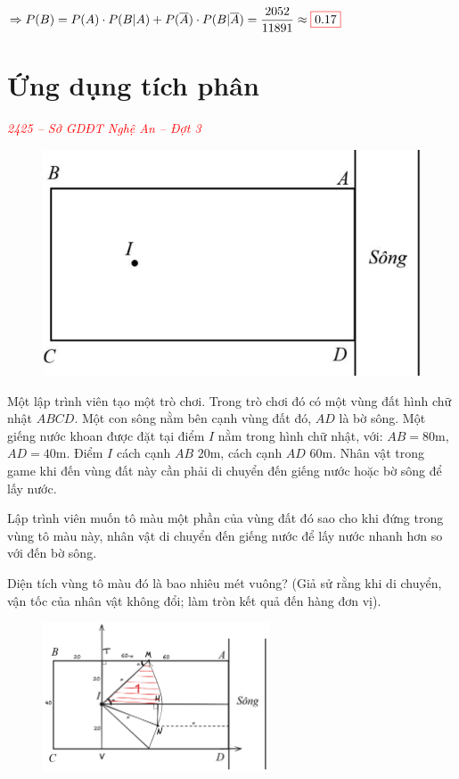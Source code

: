 \documentclass[twoside,final]{hcmut-report}
\newcommand{\exercise}[1]{\begin{exercisebox}#1\end{exercisebox}}
\newcommand{\result}[1]{\fcolorbox{red}{white}{#1}}
\begin{document}
$\Rightarrow P(B) = P(A)\cdot P(B|A) + P(\overline{A})\cdot P(B|\overline{A}) = \dfrac{2052}{11891} \approx \result{$0.17$}$
\newpage\section{Ứng dụng tích phân}
\exercise{
    \textcolor{red}{\textit{2425 -- Sở GDĐT Nghệ An -- Đợt 3}}

    \begin{figure}
        \centering
        \includegraphics*[width=1.03\linewidth]{images/Nghệ An 2025 - Đợt 3/NgheAn25-5.png}
    \end{figure}

    Một lập trình viên tạo một trò chơi. Trong trò chơi đó có một vùng đất hình chữ nhật $ABCD$. Một con sông nằm bên cạnh vùng đất đó, $AD$ là bờ sông. Một giếng nước khoan được đặt tại điểm $I$ nằm trong hình chữ nhật, với:
    $AB = 80$m, $AD = 40$m. Điểm $I$ cách cạnh $AB$ $20$m, cách cạnh $AD$ $60$m. Nhân vật trong game khi đến vùng đất này cần phải di chuyển đến giếng nước hoặc bờ sông để lấy nước.

    Lập trình viên muốn tô màu một phần của vùng đất đó sao cho khi đứng trong vùng tô màu này, nhân vật di chuyển đến giếng nước để lấy nước nhanh hơn so với đến bờ sông.

    Diện tích vùng tô màu đó là bao nhiêu mét vuông? (Giả sử rằng khi di chuyển, vận tốc của nhân vật không đổi; làm tròn kết quả đến hàng đơn vị).
}
\begin{figure}[H]
    \centering
    \includegraphics[width=0.6\textwidth]{images/Nghệ An 2025 - Đợt 3/NgheAn25-6.png}
\end{figure}
\end{document}
